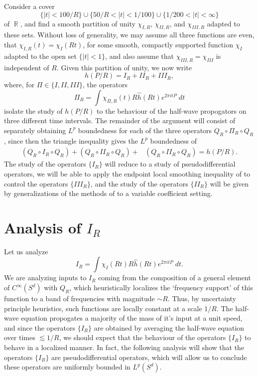 \documentclass[dvipsnames,letterpaper,12pt]{article}
\DeclareMathOperator{\RR}{\mathbb{R}}
\begin{document}
Consider a cover
%
\[ \{ |t| < 100/R \} \cup \{ 50/R < |t| < 1/100 \} \cup \{ 1/200 < |t| < \infty \} \]
%
of $\RR$, and find a smooth partition of unity $\chi_{I,R}$, $\chi_{II,R}$, and $\chi_{III,R}$ adapted to these sets. Without loss of generality, we may assume all three functions are even, that $\chi_{I,R}(t) = \chi_I(Rt)$, for some smooth, compactly supported function $\chi_I$ adapted to the open set $\{ |t| < 1 \}$, and also assume that $\chi_{III,R} = \chi_{III}$ is independent of $R$. Given this partition of unity, we now write
%
\[ h(P/R) = I_R + II_R + III_R, \]
%
where, for $\Pi \in \{ I, II, III \}$, the operators
%
\[ \Pi_R = \int \chi_{\Pi,R}(t) R \widehat{h}(Rt) e^{2 \pi i t P}\; dt \]
%
isolate the study of $h(P/R)$ to the behaviour of the half-wave propogators on three different time intervals. The remainder of the argument will consist of separately obtaining $L^p$ boundedness for each of the three operators $Q_R \circ \Pi_R \circ Q_R$, since then the triangle inequality gives the $L^p$ boundedness of
%
\begin{align*}
    (Q_R \circ I_R \circ Q_R) + (Q_R \circ II_R \circ Q_R) + &(Q_R \circ II_R \circ Q_R) = h(P/R).
\end{align*}
%
The study of the operators $\{ I_R \}$ will reduce to a study of pseudodifferential operators, we will be able to apply the endpoint local smoothing inequality of \cite{LeeSeeger} to control the operators $\{ III_R \}$, and the study of the operators $\{ II_R \}$ will be given by generalizations of the methods of \cite{HeoandNazarovandSeeger} to a variable coefficient setting.




\section{Analysis of $I_R$}

Let us analyze
%
\[ I_R = \int \chi_I(Rt) R \widehat{h}(Rt) e^{2 \pi i t P}\; dt. \]
%
We are analyzing inputs to $I_R$ coming from the composition of a general element of $C^\infty(S^d)$ with $Q_R$, which heuristically localizes the `frequency support' of this function to a band of frequencies with magnitude $\sim R$. Thus, by uncertainty principle heuristics, such functions are locally constant at a scale $1/R$. The half-wave equation propogates a majority of the mass of it's input at a unit speed, and since the operators $\{ I_R \}$ are obtained by averaging the half-wave equation over times $\lesssim 1/R$, we should expect that the behaviour of the operators $\{ I_R \}$ to behave in a localized manner. In fact, the following analysis will show that the operators $\{ I_R \}$ are pseudodifferential operators, which will allow us to conclude these operators are uniformly bounded in $L^p(S^d)$.
\end{document}
